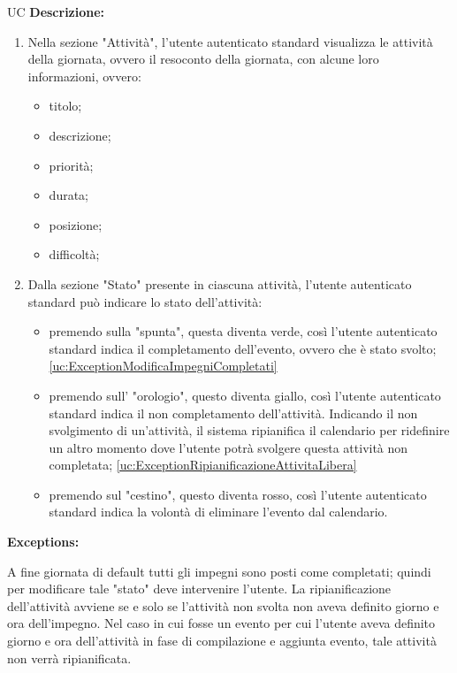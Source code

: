 \begin{listaPersonale}{UC}
    \textbf{Descrizione:}
    \begin{enumerate}
        \item Nella sezione "Attività", l'utente autenticato standard visualizza le attività della giornata, ovvero il resoconto della giornata, con alcune loro informazioni, ovvero:
              \begin{itemize}
                  \item titolo;
                  \item descrizione;
                  \item priorità;
                  \item durata;
                  \item posizione;
                  \item difficoltà;
              \end{itemize}
        \item Dalla sezione "Stato" presente in ciascuna attività, l'utente autenticato standard può indicare lo stato dell'attività:
              \begin{itemize}
                  \item premendo sulla "spunta", questa diventa verde, così l'utente autenticato standard indica il completamento dell'evento, ovvero che è stato svolto; \ref{uc:ExceptionModificaImpegniCompletati}
                  \item premendo sull' "orologio", questo diventa giallo, così l'utente autenticato standard indica il non completamento dell'attività. Indicando il non svolgimento di un'attività, il sistema ripianifica il calendario per ridefinire un altro momento dove l'utente potrà svolgere questa attività non completata; \ref{uc:ExceptionRipianificazioneAttivitaLibera}
                  \item premendo sul "cestino", questo diventa rosso, così l'utente autenticato standard indica la volontà di eliminare l'evento dal calendario.
              \end{itemize}

    \end{enumerate}



    \textbf{Exceptions:}
    \begin{enumerate}[label=\textbf{[exception \arabic{enumii}]}, ref= \textbf{[exception \arabic{enumii}]}]
         A fine giornata di default tutti gli impegni sono posti come completati; quindi per modificare tale "stato" deve intervenire l'utente.
         La ripianificazione dell'attività avviene se e solo se l'attività non svolta non aveva definito giorno e ora dell'impegno. Nel caso in cui fosse un evento per cui l'utente aveva definito giorno e ora dell'attività in fase di compilazione e aggiunta evento, tale attività non verrà ripianificata.
    \end{enumerate}







\end{listaPersonale}
